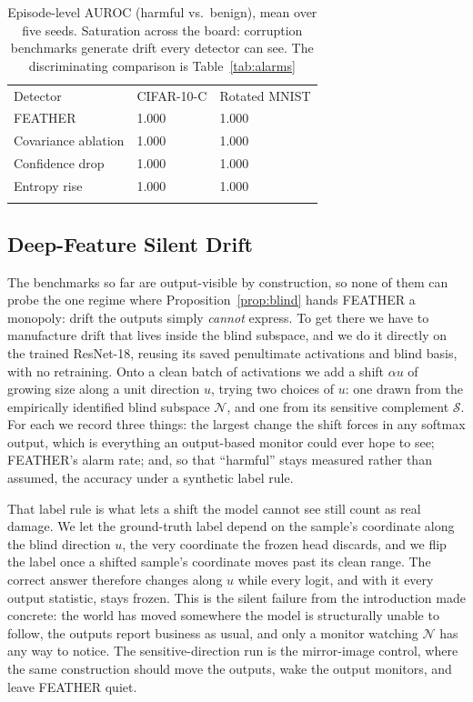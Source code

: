 \documentclass[acmsmall,screen]{acmart}
\providecommand{\svhline}{\hline}                        %
\theoremstyle{acmdefinition}
\begin{document}
\begin{table}[!t]
\caption{Episode-level AUROC (harmful vs.\ benign), mean over five seeds.
Saturation across the board: corruption benchmarks generate drift every
detector can see. The discriminating comparison is Table~\ref{tab:alarms}}
\label{tab:auroc}
\begin{tabular}{p{4.2cm}p{2.6cm}p{2.6cm}}
\hline\noalign{\smallskip}
Detector & CIFAR-10-C & Rotated MNIST \\
\noalign{\smallskip}\svhline\noalign{\smallskip}
FEATHER & 1.000 & 1.000 \\
Covariance ablation & 1.000 & 1.000 \\
Confidence drop & 1.000 & 1.000 \\
Entropy rise & 1.000 & 1.000 \\
\noalign{\smallskip}\hline\noalign{\smallskip}
\end{tabular}
\end{table}

\subsection{Deep-Feature Silent Drift}
\label{sec:blinddeep}

The benchmarks so far are output-visible by construction, so none of them can
probe the one regime where Proposition~\ref{prop:blind} hands FEATHER a
monopoly: drift the outputs simply \emph{cannot} express. To get there we have
to manufacture drift that lives inside the blind subspace, and we do it
directly on the trained ResNet-18, reusing its saved penultimate activations
and blind basis, with no retraining. Onto a clean batch of activations we add
a shift $\alpha u$ of growing size along a unit direction $u$, trying two
choices of $u$: one drawn from the empirically identified blind subspace
$\mathcal{N}$, and one from its sensitive complement $\mathcal{S}$. For each we
record three things: the largest change the shift forces in any softmax
output, which is everything an output-based monitor could ever hope to see;
FEATHER's alarm rate; and, so that ``harmful'' stays measured rather than
assumed, the accuracy under a synthetic label rule.

That label rule is what lets a shift the model cannot see still count as real
damage. We let the ground-truth label depend on the sample's coordinate along
the blind direction $u$, the very coordinate the frozen head discards, and we
flip the label once a shifted sample's coordinate moves past its clean range.
The correct answer therefore changes along $u$ while every logit, and with it
every output statistic, stays frozen. This is the silent failure from the
introduction made concrete: the world has moved somewhere the model is
structurally unable to follow, the outputs report business as usual, and only
a monitor watching $\mathcal{N}$ has any way to notice. The
sensitive-direction run is the mirror-image control, where the same
construction should move the outputs, wake the output monitors, and leave
FEATHER quiet.
\end{document}
